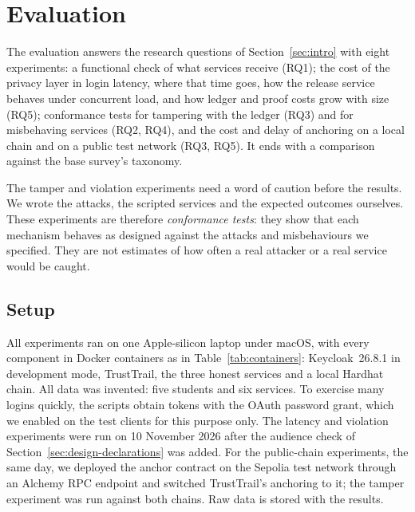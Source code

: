 \section{Evaluation}
\label{sec:evaluation}

The evaluation answers the research questions of Section~\ref{sec:intro} with eight experiments: a functional check of what services receive (RQ1); the cost of the privacy layer in login latency, where that time goes, how the release service behaves under concurrent load, and how ledger and proof costs grow with size (RQ5); conformance tests for tampering with the ledger (RQ3) and for misbehaving services (RQ2, RQ4), and the cost and delay of anchoring on a local chain and on a public test network (RQ3, RQ5). It ends with a comparison against the base survey's taxonomy.

The tamper and violation experiments need a word of caution before the results. We wrote the attacks, the scripted services and the expected outcomes ourselves. These experiments are therefore \emph{conformance tests}: they show that each mechanism behaves as designed against the attacks and misbehaviours we specified. They are not estimates of how often a real attacker or a real service would be caught.

\subsection{Setup}
All experiments ran on one Apple-silicon laptop under macOS, with every component in Docker containers as in Table~\ref{tab:containers}: Keycloak~26.8.1 in development mode, TrustTrail, the three honest services and a local Hardhat chain. All data was invented: five students and six services. To exercise many logins quickly, the scripts obtain tokens with the OAuth password grant, which we enabled on the test clients for this purpose only. The latency and violation experiments were run on 10 November 2026 after the audience check of Section~\ref{sec:design-declarations} was added. For the public-chain experiments, the same day, we deployed the anchor contract on the Sepolia test network through an Alchemy RPC endpoint and switched TrustTrail's anchoring to it; the tamper experiment was run against both chains. Raw data is stored with the results.

